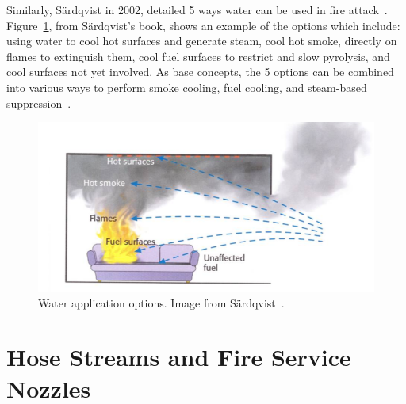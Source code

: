 \documentclass[12pt,oneside]{book}
\begin{document}
Similarly, S{\"a}rdqvist in 2002, detailed 5 ways water can be used in fire attack~\cite{sardqvist:2002}. Figure~\ref{fig:Water_Application}, from S{\"a}rdqvist's book, shows an example of the options which include: using water to cool hot surfaces and generate steam, cool hot smoke, directly on flames to extinguish them, cool fuel surfaces to restrict and slow pyrolysis, and cool surfaces not yet involved. As base concepts, the 5 options can be combined into various ways to perform smoke cooling, fuel cooling, and steam-based suppression~\cite{sardqvist:2002}.

\begin{figure}[!ht]
	\centering
	\includegraphics[width=.8\columnwidth]{Figures/Water_Distribution/water_application}
	\caption[Water Application Options]{Water application options. Image from S{\"a}rdqvist~\cite{sardqvist:2002}.}
	\label{fig:Water_Application}
\end{figure}


\section*{Hose Streams and Fire Service Nozzles}
\end{document}
